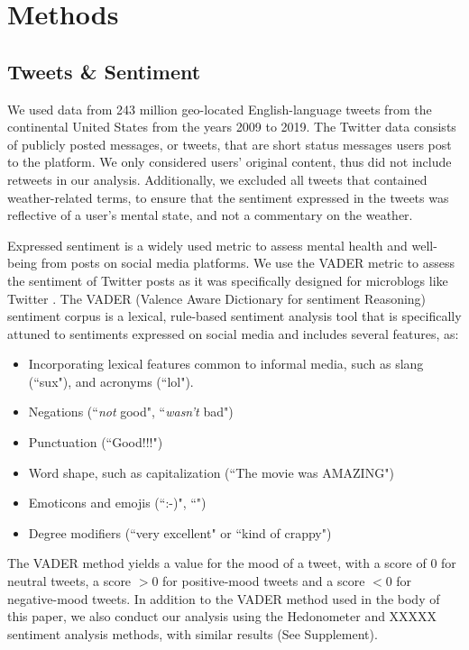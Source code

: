 \documentclass[fleqn,10pt]{wlscirep}
\begin{document}
\section*{Methods}
\subsection*{Tweets \& Sentiment}
We used data from 243 million geo-located English-language tweets from the continental United States from the years 2009 to 2019.  The Twitter data consists of publicly posted messages, or tweets, that are short status messages users post to the platform.  We only considered users’ original content, thus did not include retweets in our analysis.  Additionally, we excluded all tweets that contained weather-related terms, to ensure that the sentiment expressed in the tweets was reflective of a user's mental state, and not a commentary on the weather.

Expressed sentiment is a widely used metric to assess mental health and well-being from posts on social media platforms.  We use the VADER metric to assess the sentiment of Twitter posts as it was specifically designed for microblogs like Twitter \cite{hutto2014vader}.  The VADER (Valence Aware Dictionary for sentiment Reasoning) sentiment corpus \cite{gilbert_vader_2014} is a lexical, rule-based sentiment analysis tool that is specifically attuned to sentiments expressed on social media and includes several features, as:

\begin{itemize}
  \item Incorporating lexical features common to informal media, such as slang (``sux"), and acronyms (``lol").
  \item Negations (``\textit{not} good", ``\textit{wasn't} bad")
  \item Punctuation (``Good!!!")
  \item Word shape, such as capitalization (``The movie was AMAZING")
  \item Emoticons and emojis (``:-)", ``\emojismile")
  \item Degree modifiers (``very excellent" or ``kind of crappy")
\end{itemize} 

The VADER method yields a value for the mood of a tweet, with a score of 0 for neutral tweets, a score $> 0$ for positive-mood tweets and a score $< 0$ for negative-mood tweets.  In addition to the VADER method used in the body of this paper, we also conduct our analysis using the Hedonometer and XXXXX sentiment analysis methods, with similar results (See Supplement).
\end{document}
